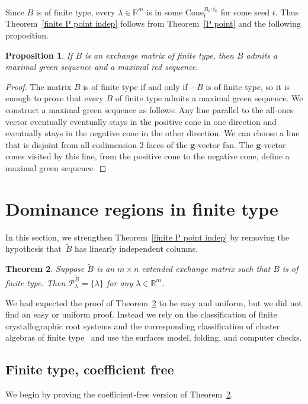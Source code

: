 \documentclass{amsart}
\newtheorem{proposition}{Proposition}[section]
\newtheorem{theorem}[proposition]{Theorem}
\theoremstyle{definition}
\theoremstyle{remark}
\numberwithin{equation}{section}
\newcommand{\reals}{\mathbb R}
\newcommand{\set}[1]{{\lbrace #1 \rbrace}}
\newcommand{\0}{{\mathbf{0}}}
\newcommand{\Cone}{\mathrm{Cone}}
\newcommand{\g}{\mathbf{g}}
\newcommand{\tB}{{\tilde{B}}}
\renewcommand{\P}{\mathcal{P}}
\begin{document}
Since $B$ is of finite type, every $\lambda\in\reals^m$ is in some $\Cone^{\tB_0;t_0}_t$ for some seed $t$.
Thus Theorem~\ref{finite P point indep} follows from Theorem~\ref{P point} and the following proposition.

\begin{proposition}\label{fin red}
If $B$ is an exchange matrix of finite type, then $B$ admits a maximal green sequence and a maximal red sequence.
\end{proposition}
\begin{proof}
The matrix $B$ is of finite type if and only if $-B$ is of finite type, so it is enough to prove that every $B$ of finite type admits a maximal green sequence.
We construct a maximal green sequence as follows:
Any line parallel to the all-ones vector eventually eventually stays in the positive cone in one direction and eventually stays in the negative cone in the other direction.
We can choose a line that is disjoint from all codimension-$2$ faces of the $\g$-vector fan.
The $\g$-vector cones visited by this line, from the positive cone to the negative cone, define a maximal green sequence.
\end{proof}

\section{Dominance regions in finite type}\label{rescue sec}
In this section, we strengthen Theorem~\ref{finite P point indep} by removing the hypothesis that~$\tB$ has linearly independent columns.

\begin{theorem}\label{finite P point}  
Suppose $\tB$ is an $m\times n$ extended exchange matrix such that $B$ is of finite type.
Then $\P^\tB_\lambda=\set{\lambda}$ for any $\lambda\in\reals^m$.
\end{theorem}

We had expected the proof of Theorem~\ref{finite P point} to be easy and uniform, but we did not find an easy or uniform proof.  
Instead we rely on the classification of finite crystallographic root systems and the corresponding classification of cluster algebras of finite type~\cite{ca2} and use the surfaces model, folding, and computer checks.

\subsection{Finite type, coefficient free}
We begin by proving the coefficient-free version of Theorem~\ref{finite P point}.
\end{document}
